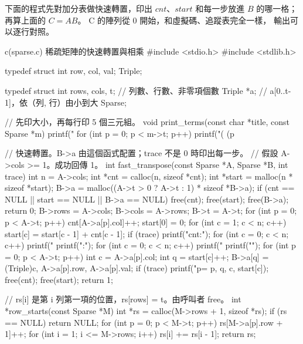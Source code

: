 下面的程式先對加分表做快速轉置，印出 $\mathit{cnt}$、$\mathit{start}$ 和每一步放進
$B$ 的哪一格；再算上面的 $C = AB$。 C 的陣列從 $0$ 開始，和虛擬碼、追蹤表完全一樣，
輸出可以逐行對照。

\begin{example}[label=ex:arr-sparse]{c}{(sparse.c) 稀疏矩陣的快速轉置與相乘}
#include <stdio.h>
#include <stdlib.h>

typedef struct {
    int row, col, val;
} Triple;

typedef struct {
    int rows, cols, t;          // 列數、行數、非零項個數
    Triple *a;                  // a[0..t-1]，依（列, 行）由小到大
} Sparse;

// 先印大小，再每行印 5 個三元組。
void print_terms(const char *title, const Sparse *m)
{
    printf("%
    for (int p = 0; p < m->t; p++)
        printf("(%
               (p %
}

// 快速轉置。B->a 由這個函式配置；trace 不是 0 時印出每一步。
// 假設 A->cols >= 1。成功回傳 1。
int fast_transpose(const Sparse *A, Sparse *B, int trace)
{
    int n = A->cols;
    int *cnt = calloc(n, sizeof *cnt);
    int *start = malloc(n * sizeof *start);
    B->a = malloc((A->t > 0 ? A->t : 1) * sizeof *B->a);
    if (cnt == NULL || start == NULL || B->a == NULL) {
        free(cnt); free(start); free(B->a);
        return 0;
    }
    B->rows = A->cols;
    B->cols = A->rows;
    B->t = A->t;
    for (int p = 0; p < A->t; p++)
        cnt[A->a[p].col]++;
    start[0] = 0;
    for (int c = 1; c < n; c++)
        start[c] = start[c - 1] + cnt[c - 1];
    if (trace) {
        printf("cnt:");
        for (int c = 0; c < n; c++) printf(" %
        printf("\nstart:");
        for (int c = 0; c < n; c++) printf(" %
        printf("\n");
    }
    for (int p = 0; p < A->t; p++) {
        int c = A->a[p].col;
        int q = start[c]++;
        B->a[q] = (Triple){c, A->a[p].row, A->a[p].val};
        if (trace)
            printf("p=%
                   p, q, c, start[c]);
    }
    free(cnt);
    free(start);
    return 1;
}

// rs[i] 是第 i 列第一項的位置，rs[rows] = t。由呼叫者 free。
int *row_starts(const Sparse *M)
{
    int *rs = calloc(M->rows + 1, sizeof *rs);
    if (rs == NULL)
        return NULL;
    for (int p = 0; p < M->t; p++)
        rs[M->a[p].row + 1]++;
    for (int i = 1; i <= M->rows; i++)
        rs[i] += rs[i - 1];
    return rs;
}


\end{example}
